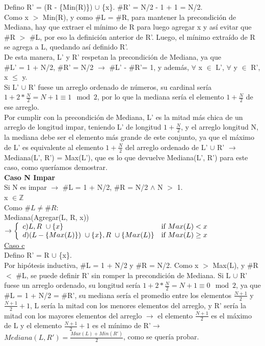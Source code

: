 \documentclass{article}
\theoremstyle{definition}
\theoremstyle{remark}
\begin{document}
Defino R' = (R - \{Min(R)\}) $\cup$ \{x\}. \#R' = N/2 - 1 + 1 = N/2. \\

Como x $>$ Min(R), y como \#L = \#R, para mantener la precondición de Mediana, hay que extraer el mínimo de R para luego agregar x y así evitar que \#R $>$ \#L, por eso la definición anterior de R'. Luego, el mínimo extraído de R se agrega a L, quedando así definido R'. \\
De esta manera, L' y R' respetan la precondición de Mediana, ya que \\ \#L' = 1 + N/2, \#R' = N/2 $\rightarrow$ \#L' - \#R'= 1, y además, $\forall$ x $\in$ L', $\forall$ y $\in$ R', x $\leq$ y. \\
Si L' $\cup$ R' fuese un arreglo ordenado de números, su cardinal sería $1 + 2 * \frac{N}{2} = N + 1 \equiv 1 \mod 2$, por lo que la mediana sería el elemento $1 + \frac{N}{2}$ de ese arreglo. \\
Por cumplir con la precondición de Mediana, L' es la mitad más chica de un arreglo de longitud impar, teniendo L' de longitud $1 + \frac{N}{2}$, y el arreglo longitud N, la mediana debe ser el elemento más grande de este conjunto, ya que el máximo de L' es equivalente al elemento $1 + \frac{N}{2}$ del arreglo ordenado de L' $\cup$ R' $\rightarrow$ Mediana(L', R') = Max(L'), que es lo que devuelve Mediana(L', R') para este caso, como queríamos demostrar.\\

\textbf{Caso N Impar} \\ 

Si N es impar $\rightarrow$ \#L = 1 + N/2, \#R = N/2 $\wedge$ N $>$ 1.\\ 

x $\in \mathds{Z}$ \\

Como $\#L \neq \#R$: \\

Mediana(Agregar(L, R, x)) $\rightarrow \left\{ \begin{array}{ll} c) L, R \ \cup \{x\} & \mbox{if } Max(L) < x \\ d) (L - \{Max(L)\}) \ \cup \{x\}, R \ \cup \{Max(L)\}  & \mbox{if } Max(L) \geq x \\ \end{array} \right.$\\
                                    
\underline{Caso c} \\

Defino R' = R $\cup$ \{x\}. \\

Por hipótesis inductiva, \#L = 1 + N/2 y \#R = N/2. Como x $>$ Max(L), y \#R $<$ \#L, se puede definir R' sin romper la precondición de Mediana.
Si L $\cup$ R' fuese un arreglo ordenado, su longitud sería $1 + 2 * \frac{N}{2} = N + 1 \equiv 0 \mod 2$, ya que \#L = 1 + N/2 = \#R', su mediana sería el promedio entre los elementos $\frac{N+1}{2}$ y $\frac{N+1}{2} + 1$, L sería la mitad con los menores elementos del arreglo, y R' sería la mitad con los mayores elementos del arreglo $\rightarrow$ el elemento $\frac{N+1}{2}$ es el máximo de L y el elemento $\frac{N+1}{2} + 1$ es el mínimo de R'$\rightarrow$ $Mediana(L, R') = \frac{Max(L) + Min(R')}{2}$, como se quería probar. \\
\end{document}
